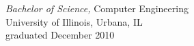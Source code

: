  {\sl Bachelor of Science,} Computer Engineering \\
	University of Illinois, Urbana, IL\\
	graduated December 2010
